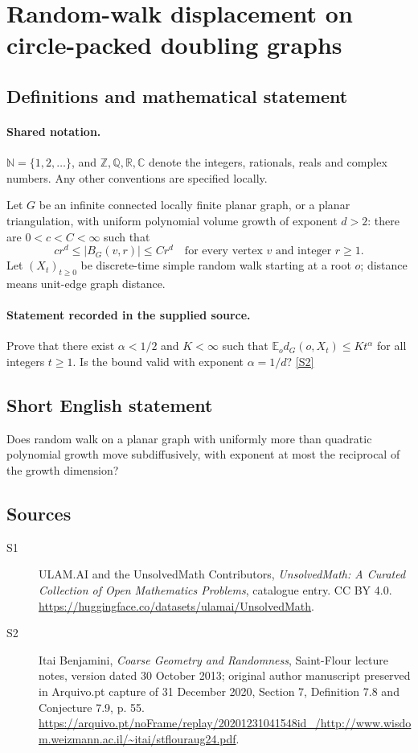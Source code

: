 \documentclass[11pt]{article}
\newcommand{\sref}[2]{\hyperlink{source:#1:#2}{[S#2]}}
\begin{document}
\section{Random-walk displacement on circle-packed doubling graphs}\label{statement}

\subsection{Definitions and mathematical statement}

\paragraph{Shared notation.}$\mathbb N=\{1,2,\ldots\}$, and $\mathbb Z,\mathbb Q,\mathbb R,\mathbb C$ denote the integers, rationals, reals and complex numbers. Any other conventions are specified locally.


Let $G$ be an infinite connected locally finite planar graph, or a planar triangulation, with uniform polynomial volume growth of exponent $d>2$: there are $0<c<C<\infty$ such that
\[c r^d\le |B_G(v,r)|\le C r^d\quad\text{for every vertex }v\text{ and integer }r\ge1.\]
Let $(X_t)_{t\ge0}$ be discrete-time simple random walk starting at a root $o$; distance means unit-edge graph distance.
\paragraph{Statement recorded in the supplied source.}
Prove that there exist $\alpha<1/2$ and $K<\infty$ such that $\mathbb E_o d_G(o,X_t)\le Kt^\alpha$ for all integers $t\ge1$. Is the bound valid with exponent $\alpha=1/d$? \sref{statement}{2}
\subsection{Short English statement}
Does random walk on a planar graph with uniformly more than quadratic polynomial growth move subdiffusively, with exponent at most the reciprocal of the growth dimension?
\subsection{Sources}
\begin{description}
\item[\hypertarget{source:statement:1}{S1}] ULAM.AI and the UnsolvedMath Contributors, \emph{UnsolvedMath: A Curated Collection of Open Mathematics Problems}, catalogue entry. CC BY 4.0. \url{https://huggingface.co/datasets/ulamai/UnsolvedMath}.
\item[\hypertarget{source:statement:2}{S2}] Itai Benjamini, \emph{Coarse Geometry and Randomness}, Saint-Flour lecture notes, version dated 30 October 2013; original author manuscript preserved in Arquivo.pt capture of 31 December 2020, Section 7, Definition 7.8 and Conjecture 7.9, p. 55. \url{https://arquivo.pt/noFrame/replay/20201231041548id_/http://www.wisdom.weizmann.ac.il/~itai/stflouraug24.pdf}.
\end{description}
\label{end:statement}
\end{document}
